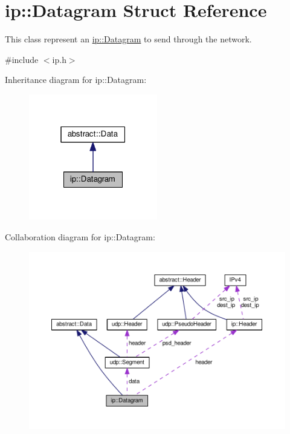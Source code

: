 \hypertarget{structip_1_1Datagram}{}\section{ip\+:\+:Datagram Struct Reference}
\label{structip_1_1Datagram}


This class represent an \hyperlink{structip_1_1Datagram}{ip\+::\+Datagram} to send through the network.  




{\ttfamily \#include $<$ip.\+h$>$}



Inheritance diagram for ip\+:\+:Datagram\+:\nopagebreak
\begin{figure}[H]
\begin{center}
\leavevmode
\includegraphics[width=159pt]{structip_1_1Datagram__inherit__graph}
\end{center}
\end{figure}


Collaboration diagram for ip\+:\+:Datagram\+:\nopagebreak
\begin{figure}[H]
\begin{center}
\leavevmode
\includegraphics[width=350pt]{structip_1_1Datagram__coll__graph}
\end{center}
\end{figure}
